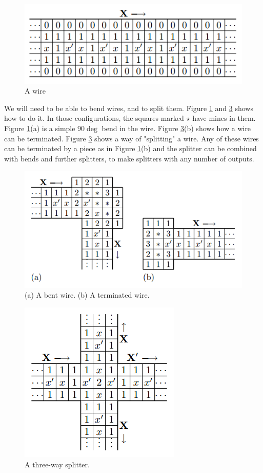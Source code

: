 \documentclass{article}
\begin{document}
\begin{figure}[H]
  \centering
  \includegraphics[scale=.9]{images/wire.png}
  \caption{A wire}
  \label{fig_bend}
\end{figure}

We will need to be able to bend wires, and to split them. Figure \ref{fig_bend} and \ref{fig_split} shows how to do it. In those configurations, the squares marked $\star$ have mines in them. Figure \ref{fig_bend}(a) is a simple $90\deg$ bend in the wire. Figure \ref{fig_split}(b) shows how a wire can be terminated. Figure \ref{fig_split} shows a way of "splitting" a wire. Any of these wires can be terminated by a piece as in Figure \ref{fig_bend}(b) and the splitter can be combined with bends and further splitters, to make splitters with any number of outputs.

\begin{figure}[H]
  \centering
  \includegraphics[scale=.9]{images/bend.png}
  \caption{(a) A bent wire. (b) A terminated wire.}
  \label{fig_wire}
\end{figure}

\begin{figure}[H]
  \centering
  \includegraphics[scale=.9]{images/split.png}
  \caption{A three-way splitter.}
  \label{fig_split}
\end{figure}
\end{document}

